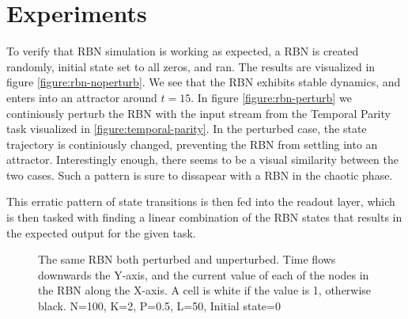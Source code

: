 \section{Experiments}

To verify that RBN simulation is working as expected,
a RBN is created randomly, initial state set to all zeros, and ran.
The results are visualized in figure \ref{figure:rbn-noperturb}.
We see that the RBN exhibits stable dynamics, and enters into an attractor around $t=15$.
In figure \ref{figure:rbn-perturb} we continiously perturb the RBN with the input stream from the Temporal Parity task visualized in \ref{figure:temporal-parity}.
In the perturbed case, the state trajectory is continiously changed, preventing the RBN from settling into an attractor.
Interestingly enough, there seems to be a visual similarity between the two cases.
Such a pattern is sure to dissapear with a RBN in the chaotic phase.

This erratic pattern of state transitions is then fed into the readout layer,
which is then tasked with finding a linear combination of the RBN states that results in the expected output for the given task.

\begin{figure}
  \caption{
    The same RBN both perturbed and unperturbed.
    Time flows downwards the Y-axis,
    and the current value of each of the nodes in the RBN along the X-axis.
    A cell is white if the value is 1, otherwise black.
    N=100, K=2, P=0.5, L=50, Initial state=0
  }
\end{figure}

